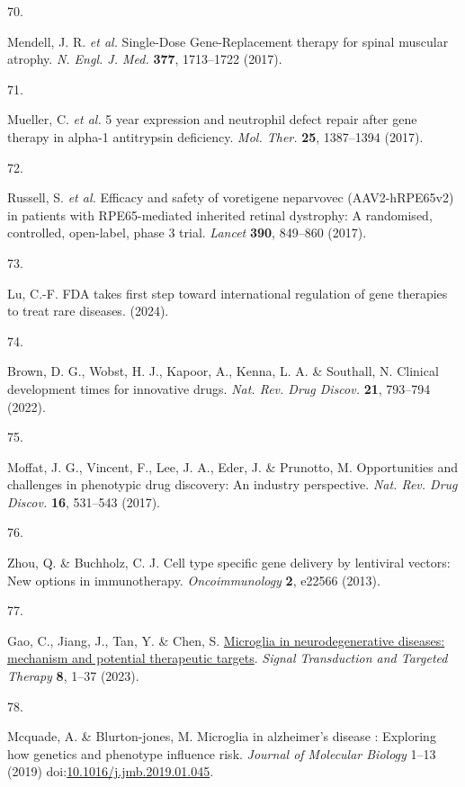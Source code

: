 \documentclass[
]{article}
\newlength{\cslhangindent}
\newlength{\csllabelwidth}
\newenvironment{CSLReferences}[2] %
 {\begin{list}{}{%
  \setlength{\itemindent}{0pt}
  \setlength{\leftmargin}{0pt}
  \setlength{\parsep}{0pt}
  \ifodd #1
   \setlength{\leftmargin}{\cslhangindent}
   \setlength{\itemindent}{-1\cslhangindent}
  \fi
  \setlength{\itemsep}{#2\baselineskip}}}
 {\end{list}}
\newcommand{\CSLLeftMargin}[1]{\parbox[t]{\csllabelwidth}{\strut#1\strut}}
\newcommand{\CSLRightInline}[1]{\parbox[t]{\linewidth - \csllabelwidth}{\strut#1\strut}}
\begin{document}
\begin{CSLReferences}{0}{0}
\CSLLeftMargin{70. }%
\CSLRightInline{Mendell, J. R. \emph{et al.} {Single-Dose}
{Gene-Replacement} therapy for spinal muscular atrophy. \emph{N. Engl.
J. Med.} \textbf{377}, 1713--1722 (2017).}

\CSLLeftMargin{71. }%
\CSLRightInline{Mueller, C. \emph{et al.} 5 year expression and
neutrophil defect repair after gene therapy in alpha-1 antitrypsin
deficiency. \emph{Mol. Ther.} \textbf{25}, 1387--1394 (2017).}

\CSLLeftMargin{72. }%
\CSLRightInline{Russell, S. \emph{et al.} Efficacy and safety of
voretigene neparvovec ({AAV2-hRPE65v2}) in patients with
{RPE65-mediated} inherited retinal dystrophy: A randomised, controlled,
open-label, phase 3 trial. \emph{Lancet} \textbf{390}, 849--860 (2017).}

\CSLLeftMargin{73. }%
\CSLRightInline{Lu, C.-F. {FDA} takes first step toward international
regulation of gene therapies to treat rare diseases. (2024).}

\CSLLeftMargin{74. }%
\CSLRightInline{Brown, D. G., Wobst, H. J., Kapoor, A., Kenna, L. A. \&
Southall, N. Clinical development times for innovative drugs. \emph{Nat.
Rev. Drug Discov.} \textbf{21}, 793--794 (2022).}

\CSLLeftMargin{75. }%
\CSLRightInline{Moffat, J. G., Vincent, F., Lee, J. A., Eder, J. \&
Prunotto, M. Opportunities and challenges in phenotypic drug discovery:
An industry perspective. \emph{Nat. Rev. Drug Discov.} \textbf{16},
531--543 (2017).}

\CSLLeftMargin{76. }%
\CSLRightInline{Zhou, Q. \& Buchholz, C. J. Cell type specific gene
delivery by lentiviral vectors: New options in immunotherapy.
\emph{Oncoimmunology} \textbf{2}, e22566 (2013).}

\CSLLeftMargin{77. }%
\CSLRightInline{Gao, C., Jiang, J., Tan, Y. \& Chen, S.
\href{https://doi.org/10.1038/s41392-023-01588-0}{Microglia in
neurodegenerative diseases: mechanism and potential therapeutic
targets}. \emph{Signal Transduction and Targeted Therapy} \textbf{8},
1--37 (2023).}

\CSLLeftMargin{78. }%
\CSLRightInline{Mcquade, A. \& Blurton-jones, M. Microglia in
alzheimer's disease : Exploring how genetics and phenotype influence
risk. \emph{Journal of Molecular Biology} 1--13 (2019)
doi:\href{https://doi.org/10.1016/j.jmb.2019.01.045}{10.1016/j.jmb.2019.01.045}.}


\end{CSLReferences}
\end{document}
